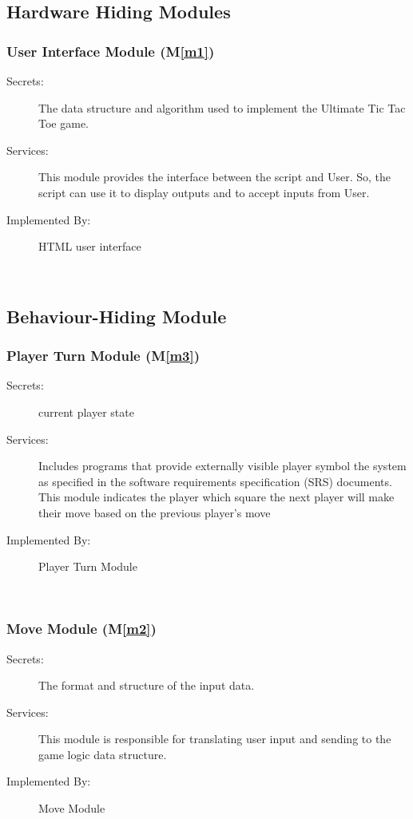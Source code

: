 \documentclass[12pt, titlepage]{article}
\newcommand{\mref}[1]{M\ref{#1}}
\begin{document}
\subsection{Hardware Hiding Modules}
\subsubsection{User Interface Module (\mref{m1})}
\begin{description}
\item[Secrets:]The data structure and algorithm used to implement the Ultimate Tic Tac Toe game.
\item[Services:]This module provides the interface between the script and User. So, the script can use it to display outputs and to accept inputs from User.
\item[Implemented By:] HTML user interface
\end{description}
 \\

\subsection{Behaviour-Hiding Module}

\subsubsection{Player Turn Module (\mref{m3})}
\begin{description}
\item[Secrets:] current player state
\item[Services:]Includes programs that provide externally visible player symbol
  the system as specified in the software requirements specification (SRS)
  documents. This module indicates the player which square the next player will make their move based on the previous player's move
\item[Implemented By:] Player Turn Module
\end{description}
 \\
\subsubsection{Move Module (\mref{m2})}
\begin{description}
\item[Secrets:]The format and structure of the input data.
\item[Services:] This module is responsible for translating user input and sending to the game logic data structure.
\item[Implemented By:] Move Module
\end{description}
 \\
\end{document}
